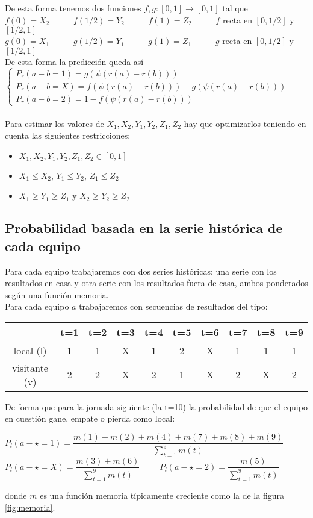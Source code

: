 De esta forma tenemos dos funciones $f,g:[0,1] \longrightarrow [0,1]$ tal que\\
$f(0)= X_{2}$ \ \ \ \ \ $f(1/2)= Y_{2}$ \ \ \ \ \ $f(1)= Z_{2}$ \ \ \ \ \ $f$ recta en $[0,1/2]$ y $[1/2,1]$\\
$g(0)= X_{1}$ \ \ \ \ \ $g(1/2)= Y_{1}$ \ \ \ \ \ $g(1)= Z_{1}$ \ \ \ \ \ $g$ recta en $[0,1/2]$ y $[1/2,1]$\\

De esta forma la predicción queda así\\

$\begin{cases}
	P_{r}(a-b=1)=g(\psi (r(a)-r(b)))\\
	P_{r}(a-b=X)=f(\psi (r(a)-r(b)))-g(\psi (r(a)-r(b)))\\
	P_{r}(a-b=2)=1-f(\psi (r(a)-r(b)))
\end{cases}$
\ \\
\ \\
Para estimar los valores de $X_{1},X_{2},Y_{1},Y_{2},Z_{1},Z_{2}$ hay que optimizarlos teniendo en cuenta las siguientes restricciones:
\begin{itemize}
	\item $X_{1},X_{2},Y_{1},Y_{2},Z_{1},Z_{2} \in [0,1]$
	\item $X_{1} \leq X_{2}$, $Y_{1} \leq Y_{2}$, $Z_{1} \leq Z_{2}$
	\item $X_{1} \geq Y_{1} \geq Z_{1}$ y $X_{2} \geq Y_{2} \geq Z_{2}$	
\end{itemize}

\subsection*{Probabilidad basada en la serie histórica de cada equipo}
Para cada equipo trabajaremos con dos series históricas: una serie con los resultados en casa y otra serie con los resultados fuera de casa, ambos ponderados según una función memoria.\\

Para cada equipo $a$ trabajaremos con secuencias de resultados del tipo:
\begin{center}
	\begin{tabular}{|c|c|c|c|c|c|c|c|c|c|}
	\hline  & t=1 & t=2 & t=3 & t=4 & t=5 & t=6 & t=7 & t=8 & t=9 \\ 
	\hline local (l)  & 1 & 1 & X & 1 & 2 & X & 1 & 1 & 1 \\ 
	\hline visitante (v) & 2 & 2 & X & 2 & 1 & X & 2 & X & 2 \\ 
	\hline 
	\end{tabular} 
\end{center}
De forma que para la jornada siguiente (la t=10) la probabilidad de que el equipo en cuestión gane, empate o pierda como local:
\begin{center}
$P_{l}(a - \star=1)=\dfrac{m(1)+m(2)+m(4)+m(7)+m(8)+m(9)}{\sum_{t=1}^{9}m(t)}$\\
$P_{l}(a - \star=X)=\dfrac{m(3)+m(6)}{\sum_{t=1}^{9}m(t)}$ \ \ \ \
$P_{l}(a - \star=2)=\dfrac{m(5)}{\sum_{t=1}^{9}m(t)}$
\end{center}
donde $m$ es una función memoria típicamente creciente como la de la figura \ref{fig:memoria}.

